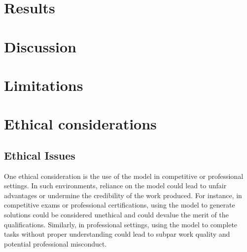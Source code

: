 \documentclass{article}
\begin{document}
\section{Results}


\section{Discussion}


\section{Limitations}

\section{Ethical considerations}


\subsection{Ethical Issues}
One ethical consideration is the use of the model in competitive or professional settings. In such environments, reliance on the model could lead to unfair advantages or undermine the credibility of the work produced. For instance, in competitive exams or professional certifications, using the model to generate solutions could be considered unethical and could devalue the merit of the qualifications. Similarly, in professional settings, using the model to complete tasks without proper understanding could lead to subpar work quality and potential professional misconduct.
\end{document}

